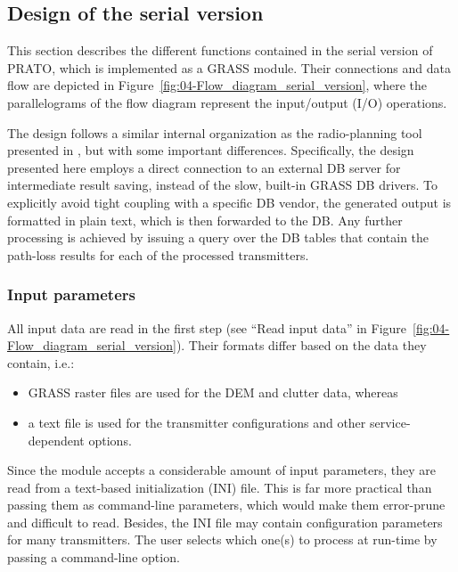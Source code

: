 \subsection{Design of the serial version}

This section describes the different functions contained in the serial
version of PRATO, which is implemented as a GRASS module. Their connections
and data flow are depicted in Figure~\ref{fig:04-Flow_diagram_serial_version},
where the parallelograms of the flow diagram represent the input/output
(I/O) operations. 

The design follows a similar internal organization as the radio-planning
tool presented in \cite{Ozimek_Open.source.radio.coverage.prediction:2010},
but with some important differences. Specifically, the design presented
here employs a direct connection to an external DB server for intermediate
result saving, instead of the slow, built-in GRASS DB drivers. To
explicitly avoid tight coupling with a specific DB vendor, the generated
output is formatted in plain text, which is then forwarded to the
DB. Any further processing is achieved by issuing a query over the
DB tables that contain the path-loss results for each of the processed
transmitters.


\subsubsection{Input parameters}

All input data are read in the first step (see ``Read input data''
in Figure~\ref{fig:04-Flow_diagram_serial_version}). Their formats
differ based on the data they contain, i.e.:
\begin{itemize}
\item GRASS raster files are used for the DEM and clutter data, whereas
\item a text file is used for the transmitter configurations and other service-dependent
options.
\end{itemize}
Since the module accepts a considerable amount of input parameters,
they are read from a text-based initialization (INI)
file. This is far more practical than passing them as command-line
parameters, which would make them error-prune and difficult to read.
Besides, the INI file may contain configuration parameters for many
transmitters. The user selects which one(s) to process at run-time
by passing a command-line option.


